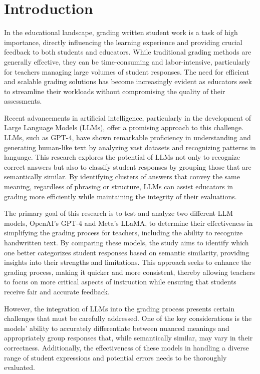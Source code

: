 \documentclass[ms,twoside,print]{nuthesis}
\begin{document}
\mainmatter

\chapter{Introduction}
In the educational landscape, grading written student work is a task of high importance, directly influencing the 
learning experience and providing crucial feedback to both students and educators. While traditional grading methods 
are generally effective, they can be time-consuming and labor-intensive, particularly for teachers managing large
volumes of student responses. The need for efficient and scalable grading solutions has become increasingly 
evident as educators seek to streamline their workloads without compromising the quality of their assessments.

Recent advancements in artificial intelligence, particularly in the development of Large Language Models (LLMs), 
offer a promising approach to this challenge. LLMs, such as GPT-4, have shown remarkable proficiency in understanding 
and generating human-like text by analyzing vast datasets and recognizing patterns in language. This research explores 
the potential of LLMs not only to recognize correct answers but also to classify student responses by grouping 
those that are semantically similar. By identifying clusters of answers that convey the same meaning, regardless 
of phrasing or structure, LLMs can assist educators in grading more efficiently while maintaining the integrity of 
their evaluations.

The primary goal of this research is to test and analyze two different LLM models, OpenAI's GPT-4 and Meta's LLaMA, 
to determine their effectiveness in simplifying the grading process for teachers, including the ability to recognize 
handwritten text. By comparing these models, the study aims to identify which one better categorizes student responses 
based on semantic similarity, providing insights into their strengths and limitations. This approach seeks to enhance 
the grading process, making it quicker and more consistent, thereby allowing teachers to focus on more critical aspects 
of instruction while ensuring that students receive fair and accurate feedback.

However, the integration of LLMs into the grading process presents certain challenges that must be carefully 
addressed. One of the key considerations is the models' ability to accurately differentiate between nuanced 
meanings and appropriately group responses that, while semantically similar, may vary in their correctness. 
Additionally, the effectiveness of these models in handling a diverse range of student expressions and 
potential errors needs to be thoroughly evaluated.
\end{document}
